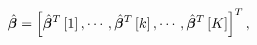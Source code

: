 \begin{equation*}
\label{eq:Beta-hat-block Structure}
\hat{\boldsymbol{\beta}} = \left[ \hat{\boldsymbol{\beta}}^T\left[ 1 \right], \cdots, \hat{\boldsymbol{\beta}}^T\left[ k \right], \cdots, \hat{\boldsymbol{\beta}}^T\left[ K \right] \right]^T,
\end{equation*}